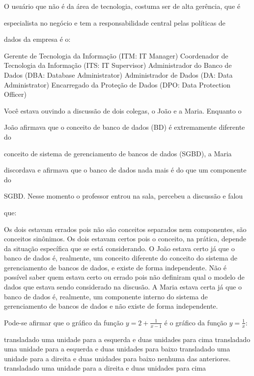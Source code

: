 \documentclass[12pt, addpoints]{exam}
\begin{document}
    \begin{questions}

    \newpage
    \question

O usuário que não é da área de tecnologia, costuma ser de alta gerência, que é

especialista no negócio e tem a responsabilidade central pelas políticas de

dados da empresa é o:
\begin{choices}
\choice Gerente de Tecnologia da Informação (ITM: IT Manager)
\choice Coordenador de Tecnologia da Informação (ITS: IT Supervisor)
\choice Administrador do Banco de Dados (DBA: Database Administrator)
\choice Administrador de Dados (DA: Data Administrator)
\choice Encarregado da Proteção de Dados (DPO: Data Protection Officer)
\end{choices}

\question

Você estava ouvindo a discussão de dois colegas, o João e a Maria. Enquanto o

João afirmava que o conceito de banco de dados (BD) é extremamente diferente do

conceito de sistema de gerenciamento de bancos de dados (SGBD), a Maria

discordava e afirmava que o banco de dados nada mais é do que um componente do

SGBD. Nesse momento o professor entrou na sala, percebeu a discussão e falou

que:
\begin{choices}
\choice Os dois estavam errados pois não são conceitos separados nem componentes, são conceitos sinônimos.
\choice Os dois estavam certos pois o conceito, na prática, depende da situação específica que se está considerando.
\choice O João estava certo já que o banco de dados é, realmente, um conceito diferente do conceito do sistema de gerenciamento de bancos de dados, e existe de forma independente.
\choice Não é possível saber quem estava certo ou errado pois não definiram qual o modelo de dados que estava sendo considerado na discusão.
\choice A Maria estava certa já que o banco de dados é, realmente, um componente interno do sistema de gerenciamento de bancos de dados e não existe de forma independente.
\end{choices}

\question

Pode-se afirmar que o gráfico da função \(y = 2 + \frac{1}{x - 1}\) é o gráfico da função \(y = \frac{1}{x}\):
\begin{choices}
\choice transladado uma unidade para a esquerda e duas unidades para cima
\choice transladado uma unidade para a esquerda e duas unidades para baixo
\choice transladado uma unidade para a direita e duas unidades para baixo
\choice nenhuma das anteriores.
\choice transladado uma unidade para a direita e duas unidades para cima
\end{choices}


\end{questions}
\end{document}
